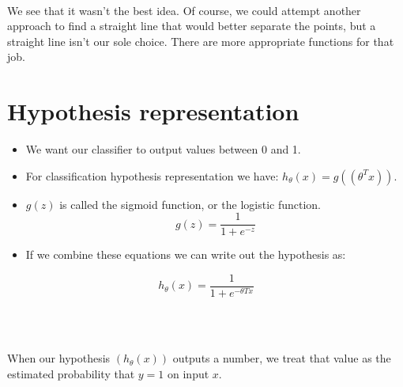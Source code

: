 \documentclass{article}
\begin{document}
~\\
We see that it wasn't the best idea. Of course, we could attempt another approach to find a straight line that would better separate the points, but a straight line isn't our sole choice. There are more appropriate functions for that job.

\section*{Hypothesis representation}
\begin{itemize}
  \item We want our classifier to output values between 0 and 1.
  \item For classification hypothesis representation we have: $h_{\theta}(x) = g((\theta^Tx))$.
  \item $g(z)$ is called the sigmoid function, or the logistic function.
        $$g(z) = \frac{1}{1 + e^{-z}}$$
  \item If we combine these equations we can write out the hypothesis as:
\end{itemize}

$$h_{\theta}(x) = \frac{1}{1+e^{-\theta Tx}}$$

~\\

~\\
When our hypothesis $(h_{\theta}(x))$ outputs a number, we treat that value as the estimated probability that $y=1$ on input $x$.
\end{document}
